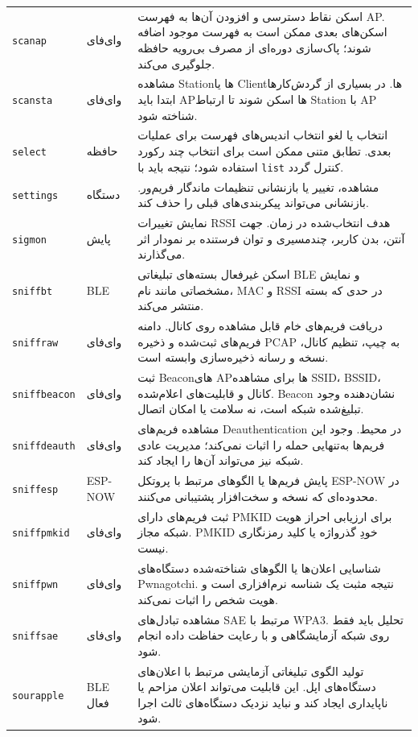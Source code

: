 \documentclass[11pt,a4paper]{article}
\newcommand{\lr}[1]{\foreignlanguage{english}{#1}}
\newcommand{\en}[1]{\lr{#1}}
\newcommand{\cmd}[1]{\lr{\nolinkurl{#1}}}
\begin{document}
\begin{longtable}{>{\raggedright\arraybackslash}p{3.4cm} >{\raggedleft\arraybackslash}p{3.2cm} >{\raggedleft\arraybackslash}p{8.7cm}}
\cmd{scanap} & وای‌فای & اسکن نقاط دسترسی و افزودن آن‌ها به فهرست AP. اسکن‌های بعدی ممکن است به فهرست موجود اضافه شوند؛ پاک‌سازی دوره‌ای از مصرف بی‌رویه حافظه جلوگیری می‌کند. \\
\cmd{scansta} & وای‌فای & مشاهده Stationها یا Clientها. در بسیاری از گردش‌کارها ابتدا باید APها اسکن شوند تا ارتباط Station با AP شناخته شود. \\
\cmd{select} & حافظه & انتخاب یا لغو انتخاب اندیس‌های فهرست برای عملیات بعدی. تطابق متنی ممکن است برای انتخاب چند رکورد استفاده شود؛ نتیجه باید با \cmd{list} کنترل گردد. \\
\cmd{settings} & دستگاه & مشاهده، تغییر یا بازنشانی تنظیمات ماندگار فریم‌ور. بازنشانی می‌تواند پیکربندی‌های قبلی را حذف کند. \\
\cmd{sigmon} & پایش & نمایش تغییرات RSSI هدف انتخاب‌شده در زمان. جهت آنتن، بدن کاربر، چندمسیری و توان فرستنده بر نمودار اثر می‌گذارند. \\
\cmd{sniffbt} & \en{BLE} & اسکن غیرفعال بسته‌های تبلیغاتی BLE و نمایش مشخصاتی مانند نام، MAC و RSSI در حدی که بسته منتشر می‌کند. \\
\cmd{sniffraw} & وای‌فای & دریافت فریم‌های خام قابل مشاهده روی کانال. دامنه فریم‌های ثبت‌شده و ذخیره PCAP به چیپ، تنظیم کانال، نسخه و رسانه ذخیره‌سازی وابسته است. \\
\cmd{sniffbeacon} & وای‌فای & ثبت Beaconهای APها برای مشاهده SSID، BSSID، کانال و قابلیت‌های اعلام‌شده. Beacon نشان‌دهنده وجود تبلیغ‌شده شبکه است، نه سلامت یا امکان اتصال. \\
\cmd{sniffdeauth} & وای‌فای & مشاهده فریم‌های Deauthentication در محیط. وجود این فریم‌ها به‌تنهایی حمله را اثبات نمی‌کند؛ مدیریت عادی شبکه نیز می‌تواند آن‌ها را ایجاد کند. \\
\cmd{sniffesp} & \en{ESP-NOW} & پایش فریم‌ها یا الگوهای مرتبط با پروتکل \en{ESP-NOW} در محدوده‌ای که نسخه و سخت‌افزار پشتیبانی می‌کنند. \\
\cmd{sniffpmkid} & وای‌فای & ثبت فریم‌های دارای PMKID برای ارزیابی احراز هویت شبکه مجاز. PMKID خودِ گذرواژه یا کلید رمزنگاری نیست. \\
\cmd{sniffpwn} & وای‌فای & شناسایی اعلان‌ها یا الگوهای شناخته‌شده دستگاه‌های \en{Pwnagotchi}. نتیجه مثبت یک شناسه نرم‌افزاری است و هویت شخص را اثبات نمی‌کند. \\
\cmd{sniffsae} & وای‌فای & مشاهده تبادل‌های \en{SAE} مرتبط با \en{WPA3}. تحلیل باید فقط روی شبکه آزمایشگاهی و با رعایت حفاظت داده انجام شود. \\
\cmd{sourapple} & \en{BLE} فعال & تولید الگوی تبلیغاتی آزمایشی مرتبط با اعلان‌های دستگاه‌های اپل. این قابلیت می‌تواند اعلان مزاحم یا ناپایداری ایجاد کند و نباید نزدیک دستگاه‌های ثالث اجرا شود. \\

\end{longtable}
\end{document}
